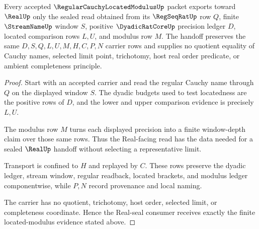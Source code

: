 \begin{theorem}
\label{thm:regular-cauchy-located-modulus-real-seal-handoff}
Every accepted $\RegularCauchyLocatedModulusUp$ packet exports toward
$\RealUp$ only the sealed read obtained from its $\RegSeqRatUp$ row $Q$, finite
$\StreamNameUp$ window $S$, positive $\DyadicRatCoreUp$ precision ledger $D$,
located comparison rows $L,U$, and modulus row $M$. The handoff preserves the
same $D,S,Q,L,U,M,H,C,P,N$ carrier rows and supplies no quotient equality of
Cauchy names, selected limit point, trichotomy, host real order predicate, or
ambient completeness principle.
\end{theorem}
\begin{proof}
Start with an accepted carrier and read the regular Cauchy name through $Q$ on
the displayed window $S$. The dyadic budgets used to test locatedness are the
positive rows of $D$, and the lower and upper comparison evidence is precisely
$L,U$.

The modulus row $M$ turns each displayed precision into a finite window-depth
claim over those same rows. Thus the Real-facing read has the data needed for a
sealed $\RealUp$ handoff without selecting a representative limit.

Transport is confined to $H$ and replayed by $C$. These rows preserve the
dyadic ledger, stream window, regular readback, located brackets, and modulus
ledger componentwise, while $P,N$ record provenance and local naming.

The carrier has no quotient, trichotomy, host order, selected limit, or
completeness coordinate. Hence the Real-seal consumer receives exactly the
finite located-modulus evidence stated above.
\end{proof}

